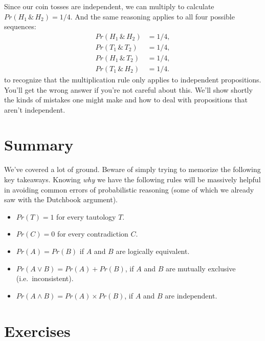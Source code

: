 \documentclass[]{tufte-book}
\providecommand{\tightlist}{%
  \setlength{\itemsep}{0pt}\setlength{\parskip}{0pt}}
\begin{document}
Since our coin tosses are independent, we can multiply to calculate \(Pr(H_1 \,\&\, H_2) = 1/4\). And the same reasoning applies to all four possible sequences:
\[
  \begin{aligned}
    Pr(H_1 \,\&\, H_2) &= 1/4,\\
    Pr(T_1 \,\&\, T_2) &= 1/4,\\
    Pr(H_1 \,\&\, T_2) &= 1/4,\\
    Pr(T_1 \,\&\, H_2) &= 1/4.
  \end{aligned}
\]
 to recognize that the multiplication rule only applies to independent propositions. You'll get the wrong answer if you're not careful about this. We'll show shortly the kinds of mistakes one might make and how to deal with propositions that aren't independent.

\hypertarget{summary-2}{%
\section{Summary}\label{summary-2}}

We've covered a lot of ground. Beware of simply trying to memorize the following key takeaways. Knowing \emph{why} we have the following rules will be massively helpful in avoiding common errors of probabilistic reasoning (some of which we already saw with the Dutchbook argument).

\begin{itemize}
\tightlist
\item
  \(Pr(T) = 1\) for every tautology \(T\).
\item
  \(Pr(C) = 0\) for every contradiction \(C\).
\item
  \(Pr(A) = Pr(B)\) if \(A\) and \(B\) are logically equivalent.
\item
  \(Pr(A \vee B) = Pr(A) + Pr(B)\), if \(A\) and \(B\) are mutually exclusive (i.e.~inconsistent).
\item
  \(Pr(A \wedge B) = Pr(A) \times Pr(B)\), if \(A\) and \(B\) are independent.
\end{itemize}

\hypertarget{exercises-8}{%
\section{Exercises}\label{exercises-8}}
\end{document}
